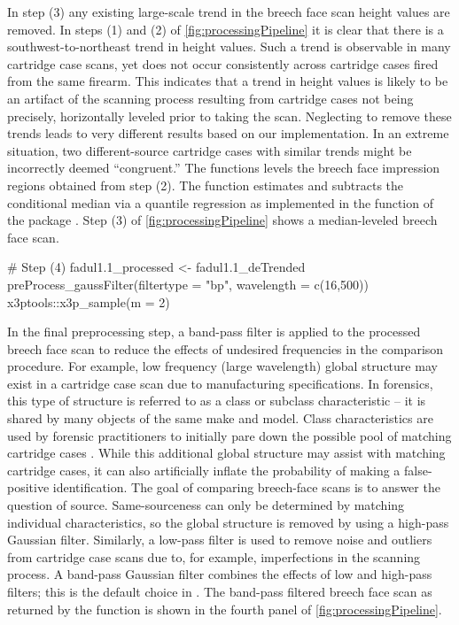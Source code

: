 In step (3) any existing large-scale trend in the breech face scan
height values are removed. In steps (1) and (2) of
\autoref{fig:processingPipeline} it is clear that there is a
southwest-to-northeast trend in height values. Such a trend is
observable in many cartridge case scans, yet does not occur consistently
across cartridge cases fired from the same firearm. This indicates that
a trend in height values is likely to be an artifact of the scanning
process resulting from cartridge cases not being precisely, horizontally
leveled prior to taking the scan. Neglecting to remove these trends
leads to very different results based on our implementation. In an
extreme situation, two different-source cartridge cases with similar
trends might be incorrectly deemed ``congruent.'' The
 functions levels the breech face
impression regions obtained from step (2). The function estimates and
subtracts the conditional median via a quantile regression as
implemented in the  function of the  package
\citep{quantreg}. Step (3) of \autoref{fig:processingPipeline} shows a
median-leveled breech face scan.

\begin{Schunk}
\begin{Sinput}
# Step (4)
fadul1.1_processed <- fadul1.1_deTrended %
  preProcess_gaussFilter(filtertype = "bp", wavelength = c(16,500)) %
  x3ptools::x3p_sample(m = 2)
\end{Sinput}
\end{Schunk}

In the final preprocessing step, a band-pass filter is applied to the
processed breech face scan to reduce the effects of undesired
frequencies in the comparison procedure. For example, low frequency
(large wavelength) global structure may exist in a cartridge case scan
due to manufacturing specifications. In forensics, this type of
structure is referred to as a class or subclass characteristic -- it is
shared by many objects of the same make and model. Class characteristics
are used by forensic practitioners to initially pare down the possible
pool of matching cartridge cases \citep{firearm_id_thompson}. While this
additional global structure may assist with matching cartridge cases, it
can also artificially inflate the probability of making a false-positive
identification. The goal of comparing breech-face scans is to answer the
question of source. Same-sourceness can only be determined by matching
individual characteristics, so the global structure is removed by using
a high-pass Gaussian filter. Similarly, a low-pass filter is used to
remove noise and outliers from cartridge case scans due to, for example,
imperfections in the scanning process. A band-pass Gaussian filter
combines the effects of low and high-pass filters; this is the default
choice in . The band-pass filtered breech face scan as
returned by the  function is shown in the
fourth panel of \autoref{fig:processingPipeline}.

